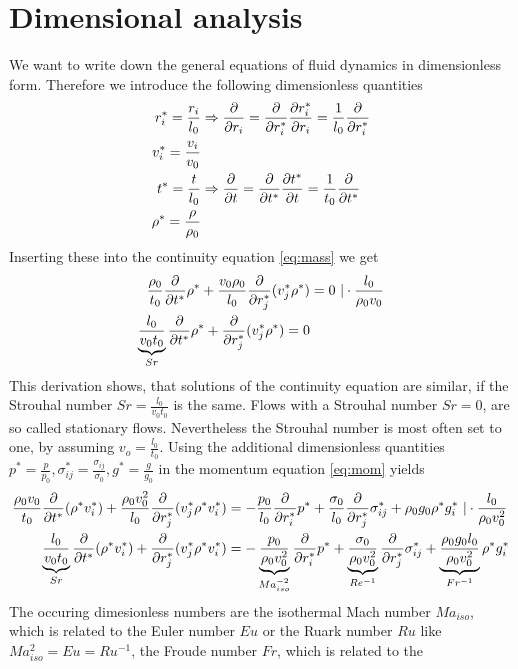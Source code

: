 \section{Dimensional analysis}
We want to write down the general equations of fluid dynamics in dimensionless
form. Therefore we introduce the following dimensionless quantities
\begin{align*}
r_i^*=\frac{r_i}{l_0} &\Rightarrow
\pd{r_i}=\pd{r_i^*}\ppd{r_i}{r_i^*}=\frac{1}{l_0}\pd{r_i^*}\\
v_i^*=\frac{v_i}{v_0}\\
t^*=\frac{t}{l_0} &\Rightarrow
\pd{t}=\pd{t^*}\ppd{t}{t^*}=\frac{1}{t_0}\pd{t^*}\\
\rho^*=\frac{\rho}{\rho_0}
\end{align*}
Inserting these into the continuity equation \eqref{eq:mass} we get
\begin{align*}
\frac{\rho_0}{t_0}\pd{t^*}\rho^* 
+ \frac{v_0 \rho_0}{l_0} \pd{r_j^*}(v_j^*\rho^*) &= 0 \ | 
\cdot \frac{l_0}{\rho_0 v_0}\\
\underbrace{\frac{l_0}{v_0 t_0}}_{Sr}\pd{t^*}\rho^* 
+ \pd{r_j^*}(v_j^*\rho^*) = 0
\end{align*}
This derivation shows, that solutions of the continuity equation
are similar, if the Strouhal number $Sr = \frac{l_0}{v_0 t_0}$ is the
same. Flows with a Strouhal number $Sr=0$, are so called stationary flows.
Nevertheless the Strouhal number is most often set to one, by assuming
$v_o=\frac{l_0}{t_0}$. 
Using the additional dimensionless quantities
$p^*=\frac{p}{p_0},\sigma_{ij}^*=\frac{\sigma_{ij}}{\sigma_0},
g^*=\frac{g}{g_0 }$
in the momentum equation \eqref{eq:mom} yields
\begin{align*}
\frac{\rho_0 v_0}{t_0}\pd{t^*}(\rho^* v_i^*) 
+ \frac{\rho_0 v_0^2}{l_0}\pd{r_j^*}(v_j^* \rho^* v_i^*) &= 
- \frac{p_0}{l_0}\pd{r_i^*}p^* 
+\frac{\sigma_0}{l_0}\pd{r_j^*}\sigma_{ij}^*
+\rho_0 g_0 \rho^* g_i^*\ | \cdot \frac{l_0}{\rho_0 v_0^2}\\
\underbrace{\frac{l_0}{v_0 t_0}}_{Sr}\pd{t^*}(\rho^* v_i^*) 
+ \pd{r_j^*}(v_j^* \rho^* v_i^*) &= 
-\underbrace{\frac{p_0}{\rho_0 v_0^2}}_{Ma^{-2}_{iso}}\pd{r_i^*}p^* 
+\underbrace{\frac{\sigma_0}{\rho_0 v_0^2}}_{Re^{-1}}\pd{r_j^*}\sigma_{ij}^*
+\underbrace{\frac{\rho_0 g_0 l_0}{\rho_0 v_0^2}}_{Fr^{-1}} \rho^* g_i^*
\end{align*}
The occuring dimesionless numbers are the isothermal Mach number $Ma_{iso}$,
which is related to the Euler number $Eu$ or the Ruark number $Ru$ like
$Ma^2_{iso}=Eu=Ru^{-1}$, the Froude number $Fr$, which is related to the
